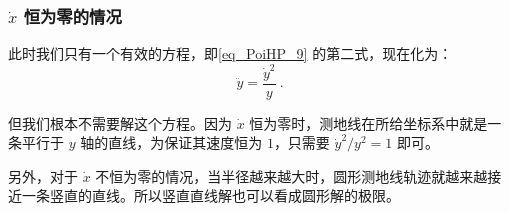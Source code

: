 \subsubsection{$\dot{x}$ 恒为零的情况}

{}

此时我们只有一个有效的方程，即\autoref{eq_PoiHP_9} 的第二式，现在化为：
\begin{equation}
\ddot{y}=\frac{\dot{y}^2}{y}~.
\end{equation}

但我们根本不需要解这个方程。因为 $\dot{x}$ 恒为零时，测地线在所给坐标系中就是一条平行于 $y$ 轴的直线，为保证其速度恒为 $1$，只需要 $\dot{y}^2/y^2=1$ 即可。

另外，对于 $\dot{x}$ 不恒为零的情况，当半径越来越大时，圆形测地线轨迹就越来越接近一条竖直的直线。所以竖直直线解也可以看成圆形解的极限。






